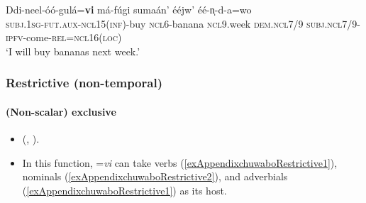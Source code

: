 \begin{exe}
	\ex\label{exAppendixChuwaboFuture}
	\gll Ddi-neel-óó-gulá=\textbf{vi} má-fúgi sumaán' ééjw' éé-n̩-d-a=wo\\
	\textsc{subj}.1\textsc{sg}-\textsc{fut}.\textsc{aux}-\textsc{ncl}15(\textsc{inf})-buy \textsc{ncl}6-banana \textsc{ncl}9.week \textsc{dem}.\textsc{ncl}7/9 \textsc{subj}.\textsc{ncl}7/9-\textsc{ipfv}-come-\textsc{rel}=\textsc{ncl}16(\textsc{loc})\\
	\glt \lq I will buy bananas next week.' \parencite[191]{Guerois2021}
\end{exe}

\subsubsection{Restrictive (non-temporal)}
\paragraph{(Non-scalar) exclusive}
\label{appendixChuwabuRestrictive}
\begin{itemize}
	\item \citeauthor{Guerois2015} (\citeyear[310–312]{Guerois2015}, \citeyear{Guerois2021}).
	\item In this function, \mbox{=\textit{vi}} can take verbs (\ref{exAppendixchuwaboRestrictive1}), nominals (\ref{exAppendixchuwaboRestrictive2}), and adverbials (\ref{exAppendixchuwaboRestrictive1}) as its host.
\end{itemize}
